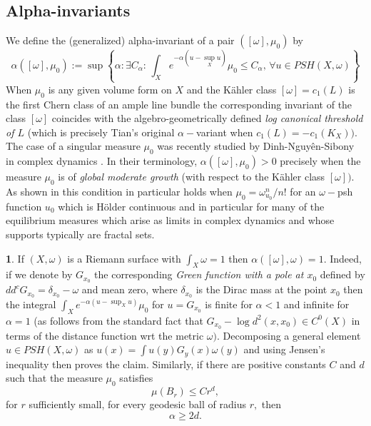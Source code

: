 \documentclass[11pt,oneside,english]{amsart}
\numberwithin{equation}{section}
\numberwithin{figure}{section}
\theoremstyle{plain}
\theoremstyle{plain}
\theoremstyle{plain}
\theoremstyle{plain}
\theoremstyle{remark}
\theoremstyle{definition}
\newtheorem{example}[thm]{\protect\examplename}
\providecommand{\examplename}{Example}
\begin{document}
\subsection{Alpha-invariants}

We define the (generalized) alpha-invariant of a pair $([\omega],\mu_{0})$
by 
\[
\alpha([\omega],\mu_{0}):=\sup\left\{ \alpha:\exists C_{\alpha}:\,\int_{X}e^{-\alpha(u-\sup_{X}u)}\mu_{0}\leq C_{\alpha},\,\forall u\in PSH(X,\omega)\right\} 
\]
When $\mu_{0}$ is any given volume form on $X$ and the Kähler class
$[\omega]=c_{1}(L)$ is the first Chern class of an ample line bundle
the corresponding invariant of the class $[\omega]$ coincides with
the algebro-geometrically defined \emph{log canonical threshold of
$L$} \cite{dem2} (which is precisely Tian's original $\alpha-$variant
\cite{ti1} when $c_{1}(L)=-c_{1}(K_{X})).$ The case of a singular
measure $\mu_{0}$ was recently studied by Dinh-Nguyên-Sibony in complex
dynamics \cite{d-s}. In their terminology, $\alpha([\omega],\mu_{0})>0$
precisely when the measure $\mu_{0}$ is of \emph{global moderate
growth} (with respect to the Kähler class $[\omega]).$ As shown in
\cite{d-s} this condition in particular holds when $\mu_{0}=\omega_{u_{0}}^{n}/n!$
for an $\omega-$psh function $u_{0}$ which is Hölder continuous
and in particular for many of the equilibrium measures which arise
as limits in complex dynamics and whose supports typically are fractal
sets.
\begin{example}
\label{exa:fractal m-t}If $(X,\omega)$ is a Riemann surface with
$\int_{X}\omega=1$ then $\alpha([\omega],\omega)=1.$ Indeed, if
we denote by $G_{x_{0}}$ the corresponding \emph{Green function with
a pole at $x_{0}$} defined by $dd^{c}G_{x_{0}}=\delta_{x_{0}}-\omega$
and mean zero, where $\delta_{x_{0}}$ is the Dirac mass at the point
$x_{0}$ then the integral $\int_{X}e^{-\alpha(u-\sup_{X}u)}\mu_{0}$
for $u=G_{x_{0}}$ is finite for $\alpha<1$ and infinite for $\alpha=1$
(as follows from the standard fact that $G_{x_{0}}-\log d^{2}(x,x_{0})\in C^{0}(X)$
in terms of the distance function wrt the metric $\omega).$ Decomposing
a general element $u\in PSH(X,\omega)$ as $u(x)=\int u(y)G_{y}(x)\omega(y)$
and using Jensen's inequality then proves the claim. Similarly, if
there are positive constants $C$ and $d$ such that the measure $\mu_{0}$
satisfies 
\[
\mu(B_{r})\leq Cr^{d},
\]
 for $r$ sufficiently small, for every geodesic ball of radius $r,$
then 
\[
\alpha\geq2d.
\]
\end{example}
\end{document}
